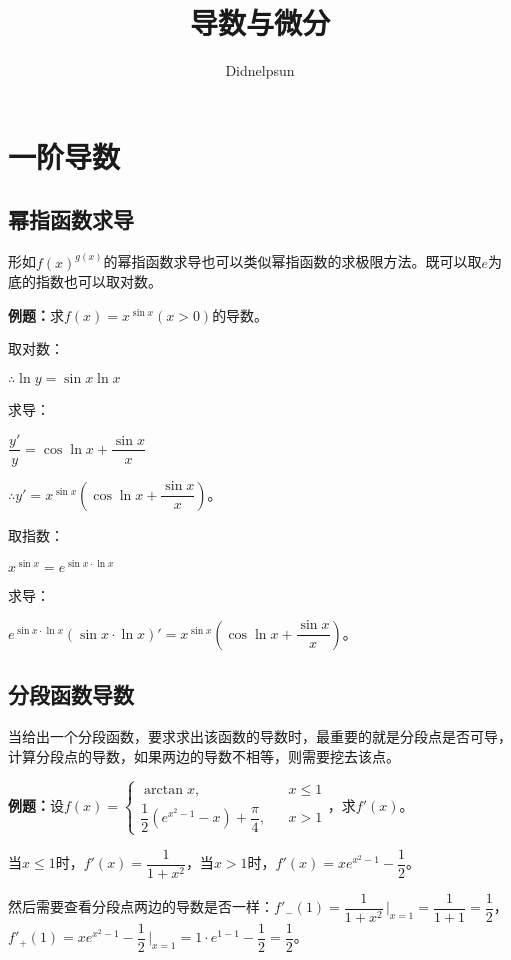 \documentclass[UTF8, 12pt]{ctexart}
\author{Didnelpsun}
\title{导数与微分}
\date{}
\begin{document}
\maketitle
\pagestyle{empty}
\thispagestyle{empty}
\tableofcontents
\thispagestyle{empty}
\newpage
\pagestyle{plain}
\setcounter{page}{1}
\section{一阶导数}
\subsection{幂指函数求导}

形如$f(x)^{g(x)}$的幂指函数求导也可以类似幂指函数的求极限方法。既可以取$e$为底的指数也可以取对数。

\textbf{例题：}求$f(x)=x^{\sin x}(x>0)$的导数。

取对数：

$\therefore\ln y=\sin x\ln x$

求导：

$\dfrac{y'}{y}=\cos\ln x+\dfrac{\sin x}{x}$

$\therefore y'=x^{\sin x}\left(\cos\ln x+\dfrac{\sin x}{x}\right)$。

取指数：

$x^{\sin x}=e^{\sin x\cdot\ln x}$

求导：

$e^{\sin x\cdot\ln x}(\sin x\cdot\ln x)'=x^{\sin x}\left(\cos\ln x+\dfrac{\sin x}{x}\right)$。

\subsection{分段函数导数}

当给出一个分段函数，要求求出该函数的导数时，最重要的就是分段点是否可导，计算分段点的导数，如果两边的导数不相等，则需要挖去该点。\medskip

\textbf{例题：}设$f(x)=\left\{\begin{array}{lcl}
    \arctan x, & & x\leqslant 1 \\
    \dfrac{1}{2}(e^{x^2-1}-x)+\dfrac{\pi}{4}, & & x>1
\end{array}
\right.$，求$f'(x)$。

当$x\leqslant 1$时，$f'(x)=\dfrac{1}{1+x^2}$，当$x>1$时，$f'(x)=xe^{x^2-1}-\dfrac{1}{2}$。

然后需要查看分段点两边的导数是否一样：$f'_-(1)=\dfrac{1}{1+x^2}\,\bigg\vert_{x=1}=\dfrac{1}{1+1}=\dfrac{1}{2}$，$f'_+(1)=xe^{x^2-1}-\dfrac{1}{2}\,\bigg\vert_{x=1}=1\cdot e^{1-1}-\dfrac{1}{2}=\dfrac{1}{2}$。\medskip
\end{document}
